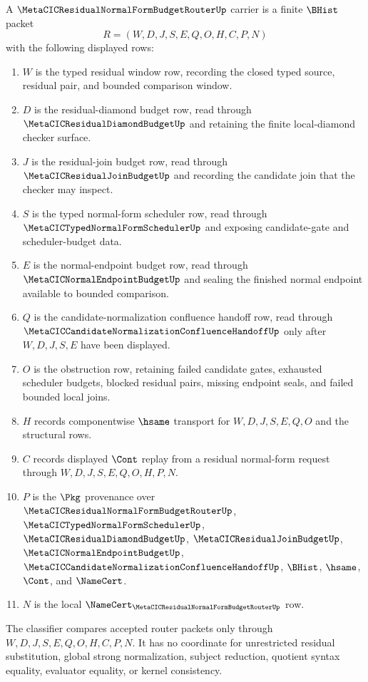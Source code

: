\begin{definition}
\label{def:metacic-residual-normal-form-budget-router-carrier}
A $\MetaCICResidualNormalFormBudgetRouterUp$ carrier is a finite $\BHist$ packet
$$
R=(W,D,J,S,E,Q,O,H,C,P,N)
$$
with the following displayed rows:
\begin{enumerate}
\item $W$ is the typed residual window row, recording the closed typed source, residual pair, and bounded comparison window.
\item $D$ is the residual-diamond budget row, read through $\MetaCICResidualDiamondBudgetUp$ and retaining the finite local-diamond checker surface.
\item $J$ is the residual-join budget row, read through $\MetaCICResidualJoinBudgetUp$ and recording the candidate join that the checker may inspect.
\item $S$ is the typed normal-form scheduler row, read through $\MetaCICTypedNormalFormSchedulerUp$ and exposing candidate-gate and scheduler-budget data.
\item $E$ is the normal-endpoint budget row, read through $\MetaCICNormalEndpointBudgetUp$ and sealing the finished normal endpoint available to bounded comparison.
\item $Q$ is the candidate-normalization confluence handoff row, read through $\MetaCICCandidateNormalizationConfluenceHandoffUp$ only after $W,D,J,S,E$ have been displayed.
\item $O$ is the obstruction row, retaining failed candidate gates, exhausted scheduler budgets, blocked residual pairs, missing endpoint seals, and failed bounded local joins.
\item $H$ records componentwise $\hsame$ transport for $W,D,J,S,E,Q,O$ and the structural rows.
\item $C$ records displayed $\Cont$ replay from a residual normal-form request through $W,D,J,S,E,Q,O,H,P,N$.
\item $P$ is the $\Pkg$ provenance over $\MetaCICResidualNormalFormBudgetRouterUp$, $\MetaCICTypedNormalFormSchedulerUp$, $\MetaCICResidualDiamondBudgetUp$, $\MetaCICResidualJoinBudgetUp$, $\MetaCICNormalEndpointBudgetUp$, $\MetaCICCandidateNormalizationConfluenceHandoffUp$, $\BHist$, $\hsame$, $\Cont$, and $\NameCert$.
\item $N$ is the local $\NameCert_{\MetaCICResidualNormalFormBudgetRouterUp}$ row.
\end{enumerate}
The classifier compares accepted router packets only through $W,D,J,S,E,Q,O,H,C,P,N$. It has no coordinate for unrestricted residual substitution, global strong normalization, subject reduction, quotient syntax equality, evaluator equality, or kernel consistency.
\end{definition}

